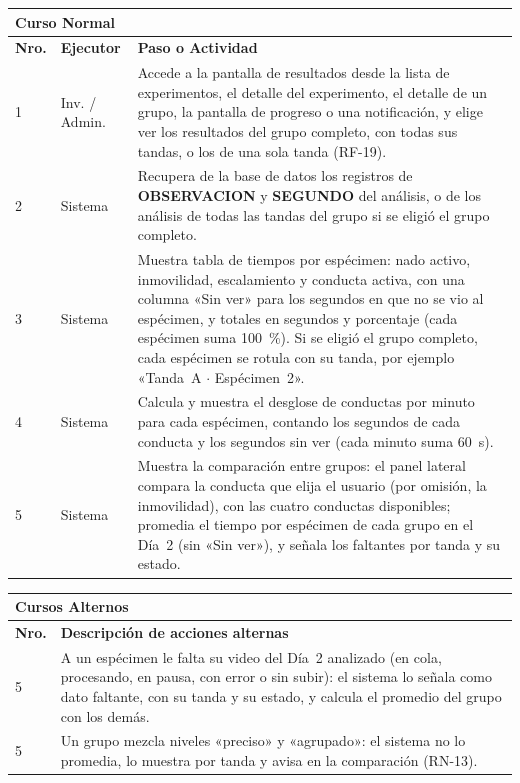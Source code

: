 \noindent
\begin{tabular}{|p{1.0cm}|p{3.7cm}|p{9.5cm}|}
\hline
\multicolumn{3}{|l|}{\textbf{Curso Normal}} \\
\hline
\textbf{Nro.} & \textbf{Ejecutor} & \textbf{Paso o Actividad} \\
\hline
1 & Inv. / Admin. & Accede a la pantalla de resultados desde la lista de experimentos, el detalle del experimento, el detalle de un grupo, la pantalla de progreso o una notificación, y elige ver los resultados del grupo completo, con todas sus tandas, o los de una sola tanda (RF-19). \\
\hline
2 & Sistema & Recupera de la base de datos los registros de \textbf{OBSERVACION} y \textbf{SEGUNDO} del análisis, o de los análisis de todas las tandas del grupo si se eligió el grupo completo. \\
\hline
3 & Sistema & Muestra tabla de tiempos por espécimen: nado activo, inmovilidad, escalamiento y conducta activa, con una columna «Sin ver» para los segundos en que no se vio al espécimen, y totales en segundos y porcentaje (cada espécimen suma 100~\%). Si se eligió el grupo completo, cada espécimen se rotula con su tanda, por ejemplo «Tanda~A $\cdot$ Espécimen~2». \\
\hline
4 & Sistema & Calcula y muestra el desglose de conductas por minuto para cada espécimen, contando los segundos de cada conducta y los segundos sin ver (cada minuto suma 60~s). \\
\hline
5 & Sistema & Muestra la comparación entre grupos: el panel lateral compara la conducta que elija el usuario (por omisión, la inmovilidad), con las cuatro conductas disponibles; promedia el tiempo por espécimen de cada grupo en el Día~2 (sin «Sin ver»), y señala los faltantes por tanda y su estado. \\
\hline
\end{tabular}

\noindent
\begin{tabular}{|p{1.0cm}|p{13.6cm}|}
\hline
\multicolumn{2}{|l|}{\textbf{Cursos Alternos}} \\
\hline
\textbf{Nro.} & \textbf{Descripción de acciones alternas} \\
\hline
5 & A un espécimen le falta su video del Día~2 analizado (en cola, procesando, en pausa, con error o sin subir): el sistema lo señala como dato faltante, con su tanda y su estado, y calcula el promedio del grupo con los demás. \\
\hline
5 & Un grupo mezcla niveles «preciso» y «agrupado»: el sistema no lo promedia, lo muestra por tanda y avisa en la comparación (RN-13). \\
\hline
\end{tabular}

